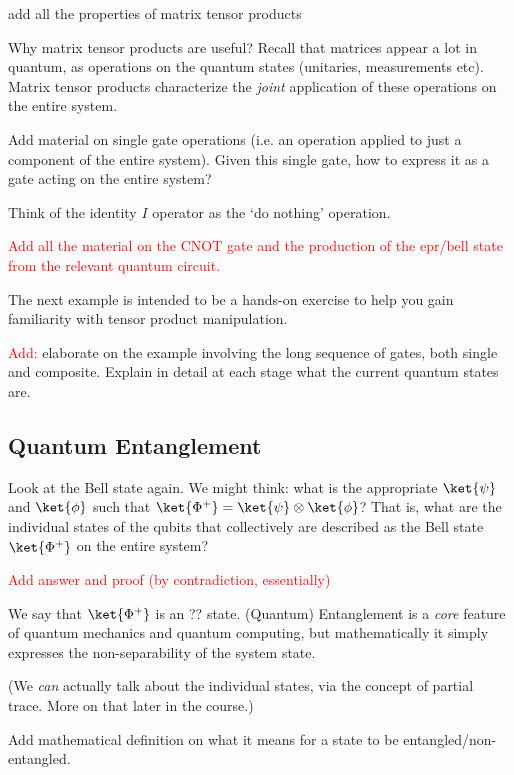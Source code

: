 \begin{proposition}
    add all the properties of matrix tensor products
\end{proposition}

Why matrix tensor products are useful? Recall that matrices appear a lot in quantum, as operations on the quantum states (unitaries, measurements etc). Matrix tensor products characterize the \textit{joint} application of these operations on the entire system.

Add material on single gate operations (i.e. an operation applied to just a component of the entire system). Given this single gate, how to express it as a gate acting on the entire system?

Think of the identity $I$ operator as the `do nothing' operation.

\textcolor{red}{Add all the material on the CNOT gate and the production of the epr/bell state from the relevant quantum circuit.}

The next example is intended to be a hands-on exercise to help you gain familiarity with tensor product manipulation.
\begin{example}
    \textcolor{red}{Add:} elaborate on the example involving the long sequence of gates, both single and composite. Explain in detail at each stage what the current quantum states are. 
\end{example}

\subsection{Quantum Entanglement}
Look at the Bell state again. We might think: what is the appropriate $\ket{\psi}$ and $\ket{\phi}$ such that $\ket{\Phi^+} = \ket{\psi} \otimes \ket{\phi}$? That is, what are the individual states of the qubits that collectively are described as the Bell state $\ket{\Phi^+}$ on the entire system?

\textcolor{red}{Add answer and proof (by contradiction, essentially)}

We say that $\ket{\Phi^+}$ is an ?? state. (Quantum) Entanglement is a \textit{core} feature of quantum mechanics and quantum computing, but mathematically it simply expresses the non-separability of the system state.

(We \textit{can} actually talk about the individual states, via the concept of partial trace. More on that later in the course.)

\begin{definition}
    Add mathematical definition on what it means for a state to be entangled/non-entangled.
\end{definition}


